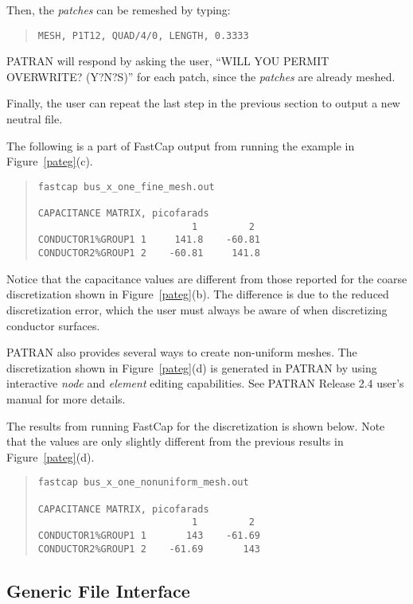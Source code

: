 Then, the {\em patches} can be remeshed by typing:
\begin{quote}
\begin{verbatim}
MESH, P1T12, QUAD/4/0, LENGTH, 0.3333
\end{verbatim}
\end{quote}
PATRAN will respond by asking the user, ``WILL YOU PERMIT OVERWRITE?
(Y?N?S)'' for each patch, since the {\em patches} are already meshed.

Finally, the user can repeat the last step in the previous section to
output a new neutral file.

The following is a part of FastCap output from running the example in
Figure~\ref{pateg}(c).
\begin{quote}
\begin{verbatim}
fastcap bus_x_one_fine_mesh.out

CAPACITANCE MATRIX, picofarads
                           1         2 
CONDUCTOR1%GROUP1 1     141.8    -60.81
CONDUCTOR2%GROUP1 2    -60.81     141.8
\end{verbatim}
\end{quote}

Notice that the capacitance values are different from those reported
for the coarse discretization shown in Figure~\ref{pateg}(b).  The
difference is due to the reduced discretization error, which the user
must always be aware of when discretizing conductor surfaces.

PATRAN also provides several ways to create non-uniform meshes.  The
discretization shown in Figure~\ref{pateg}(d) is generated in PATRAN
by using interactive {\em node} and {\em element} editing
capabilities.  See PATRAN Release 2.4 user's manual for more details.

The results from running FastCap for the discretization is shown
below.  Note that the values are only slightly different from the
previous results in Figure~\ref{pateg}(d). 
\begin{quote}
\begin{verbatim}
fastcap bus_x_one_nonuniform_mesh.out

CAPACITANCE MATRIX, picofarads
                           1         2 
CONDUCTOR1%GROUP1 1       143    -61.69
CONDUCTOR2%GROUP1 2    -61.69       143
\end{verbatim}
\end{quote}


\subsection{Generic File Interface}
\label{generc}


